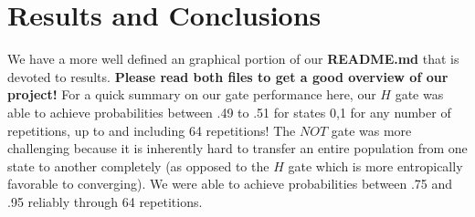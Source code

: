 \documentclass{article}
\begin{document}
\section{Results and Conclusions}
We have a more well defined an graphical portion of our \textbf{README.md} that is devoted to results. \textbf{
Please read both files to get a good overview of our project!} For a quick summary on our gate performance here,
our $H$ gate was able to achieve probabilities between .49 to .51 for states 0,1 for any number of repetitions,
up to and including 64 repetitions! The $NOT$ gate was more challenging because it is inherently hard to transfer
an entire population from one state to another completely (as opposed to the $H$ gate which is more entropically 
favorable to converging).
We were able to achieve probabilities between .75 and .95 reliably through 64 repetitions. 
\end{document}
